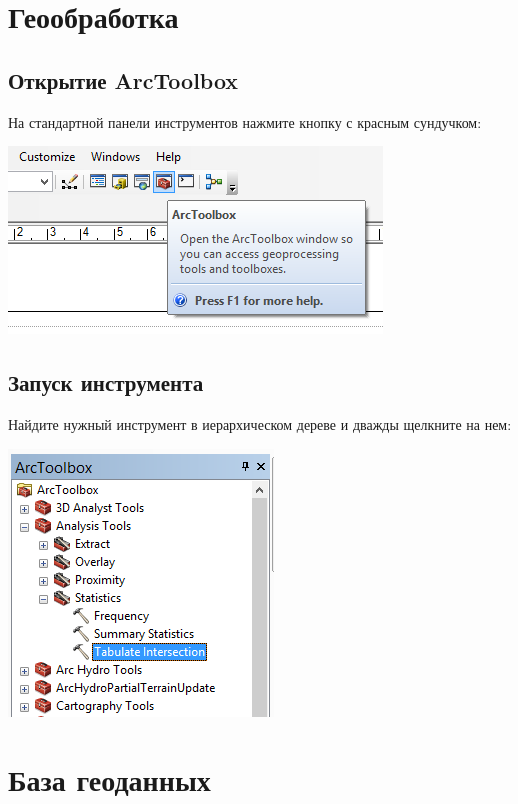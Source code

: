 \documentclass[12pt,]{book}
\begin{document}
\hypertarget{manual-toolbox}{%
\chapter{Геообработка}\label{manual-toolbox}}

\hypertarget{arctoolbox}{%
\section{Открытие ArcToolbox}\label{arctoolbox}}

На стандартной панели инструментов нажмите кнопку с красным сундучком:

\includegraphics{images/Appendix/image97.png}

\hypertarget{section-7}{%
\section{Запуск инструмента}\label{section-7}}

Найдите нужный инструмент в иерархическом дереве и дважды щелкните на нем:

\includegraphics{images/Appendix/image98.png}

\hypertarget{manual-gdb}{%
\chapter{База геоданных}\label{manual-gdb}}
\end{document}
